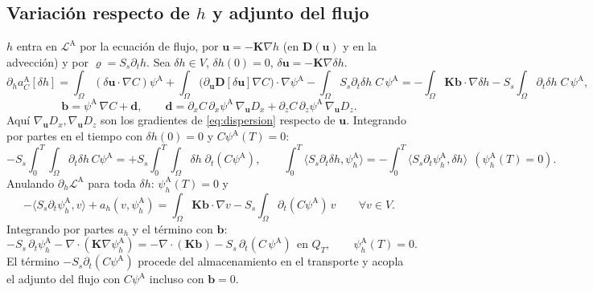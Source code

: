 \documentclass[11pt]{article}
\numberwithin{equation}{section}
\theoremstyle{remark}
\newcommand{\bu}{\mathbf{u}}
\newcommand{\bK}{\mathbf{K}}
\newcommand{\bD}{\mathbf{D}}
\newcommand{\bb}{\mathbf{b}}
\newcommand{\bd}{\mathbf{d}}
\newcommand{\vr}{\varrho}              %
\newcommand{\pA}{\psi^{\mathrm{A}}}    %
\newcommand{\ph}[1]{\psi_h^{\mathrm{#1}}}  %
\begin{document}
\subsection{Variaci\'on respecto de $h$ y adjunto del flujo}
$h$ entra en $\mathcal{L}^{\mathrm A}$ por la ecuaci\'on de flujo, por $\bu=-\bK\nabla h$ (en $\bD(\bu)$ y en la advecci\'on) y por $\vr=S_s\partial_th$. Sea $\delta h\in V$, $\delta h(0)=0$, $\delta\bu=-\bK\nabla\delta h$.
\[
\partial_ha_C^{\mathrm A}[\delta h]=\int_\Omega(\delta\bu\cdot\nabla C)\pA+\int_\Omega\bigl(\partial_{\bu}\bD[\delta\bu]\nabla C\bigr)\!\cdot\!\nabla\pA-\int_\Omega S_s\partial_t\delta h\;C\,\pA
=-\int_\Omega\bK\bb\cdot\nabla\delta h-S_s\!\int_\Omega\partial_t\delta h\;C\,\pA,
\]
\begin{equation}
\bb=\pA\,\nabla C+\bd,\qquad\bd=\partial_xC\,\partial_x\pA\,\nabla_{\bu}D_x+\partial_zC\,\partial_z\pA\,\nabla_{\bu}D_z .
\label{eq:bb}
\end{equation}
Aqu\'i $\nabla_{\bu}D_x,\nabla_{\bu}D_z$ son los gradientes de \eqref{eq:dispersion} respecto de $\bu$. Integrando por partes en el tiempo con $\delta h(0)=0$ y $C\pA(T)=0$:
\[
-S_s\!\int_0^T\!\!\!\int_\Omega\partial_t\delta h\,C\pA=+S_s\!\int_0^T\!\!\!\int_\Omega\delta h\;\partial_t(C\pA),\qquad
\int_0^T\langle S_s\partial_t\delta h,\ph{A}\rangle=-\int_0^T\langle S_s\partial_t\ph{A},\delta h\rangle\ \ (\ph{A}(T)=0).
\]
Anulando $\partial_h\mathcal{L}^{\mathrm A}$ para toda $\delta h$: $\ph{A}(T)=0$ y
\begin{equation}
-\langle S_s\partial_t\ph{A},v\rangle+a_h(v,\ph{A})=\int_\Omega\bK\bb\cdot\nabla v-S_s\!\int_\Omega\partial_t(C\pA)\,v\qquad\forall v\in V .
\label{eq:adj_flujo_debil_A}
\end{equation}
Integrando por partes $a_h$ y el t\'ermino con $\bb$:
\begin{equation}
\boxed{-S_s\,\partial_t\ph{A}-\nabla\!\cdot(\bK\nabla\ph{A})=-\nabla\!\cdot(\bK\bb)-S_s\,\partial_t(C\,\pA)\ \ \text{en }Q_T,\qquad\ph{A}(T)=0.}
\label{eq:adj_flujo_A}
\end{equation}
El t\'ermino $-S_s\partial_t(C\pA)$ procede del almacenamiento en el transporte y acopla el adjunto del flujo con $C\pA$ incluso con $\bb=0$.
\end{document}
